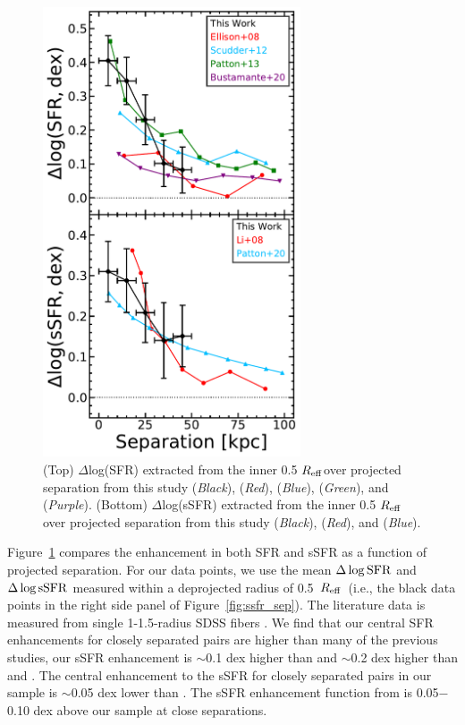 \documentclass[apj,twocolumn]{emulateapj}
\newcommand{\reff}{$R_{\rm eff}$}
\begin{document}
\begin{CJK*}{UTF8}{gbsn}
\begin{figure}
\centering
\includegraphics[width=3in]{nuc_sep.pdf}
\caption[]{(Top) $\Delta$log(SFR) extracted from the inner 0.5 \reff over projected separation from this study ({\it Black}), \citet{Ellison:2008} ({\it Red}), \citet{Scudder:2012} ({\it Blue}), \citet{Patton:2013} ({\it Green}), and \citet{Bustamante:2020} ({\it Purple}). (Bottom) $\Delta$log(sSFR) extracted from the inner 0.5 \reff over projected separation from this study ({\it Black}), \citet{Li:2008} ({\it Red}), and \citet{Patton:2020} ({\it Blue}).
}
\label{fig:nuc_sep}
\end{figure}

Figure~\ref{fig:nuc_sep} compares the enhancement in both SFR and sSFR as a function of projected separation. For our data points, we use the mean $\Delta\log{\rm SFR}$ and $\Delta\log{\rm sSFR}$ measured within a deprojected radius of 0.5~\reff\ (i.e., the black data points in the right side panel of Figure~\ref{fig:ssfr_sep}). The literature data is measured from single 1-1.5\arcsec-radius SDSS fibers \citep{Ellison:2008,Scudder:2012,Patton:2013,Bustamante:2020}. We find that our central SFR enhancements for closely separated pairs are higher than many of the previous studies, our sSFR enhancement is $\sim$0.1 dex higher than \citet{Scudder:2012} and $\sim$0.2 dex higher than \citet{Ellison:2008} and \citet{Bustamante:2020}. The central enhancement to the sSFR for closely separated pairs in our sample is $\sim$0.05 dex lower than \citet{Patton:2013}. The sSFR enhancement function from \citet{Li:2008} is 0.05$-$0.10 dex above our sample at close separations.   


\end{CJK*}
\end{document}
